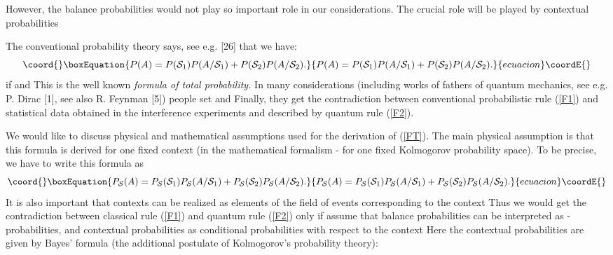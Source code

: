 \documentclass[12pt,oneside,final,a4paper]{article}
\begin{document}
However, the balance probabilities \coordHE{}  would not play 
so important role in our considerations. The crucial role will be played by contextual
probabilities \coordHE{} 





The conventional probability theory says, see e.g. [26] 
that we have:
\begin{equation}\coord{}\boxEquation{
\label{FT}
P(A)= P({\cal S}_1) P(A/{\cal S}_1) + P({\cal S}_2) P(A/{\cal S}_2).
}{
P(A)= P({\cal S}_1) P(A/{\cal S}_1) + P({\cal S}_2) P(A/{\cal S}_2).
}{ecuacion}\coordE{}\end{equation}
if \coordHE{} and \coordHE{}
This is the well known {\it formula of total probability.}
In many considerations (including works of fathers 
of quantum mechanics, see e.g. P. Dirac [1], see also R. Feynman [5]) people 
set \coordHE{} and \coordHE{}
Finally, they get the contradiction between conventional
probabilistic rule (\ref{F1}) and statistical data obtained
in the interference experiments and described by quantum rule (\ref{F2}).


We would like to discuss physical and mathematical
assumptions used for the derivation of (\ref{FT}).
The main physical assumption is that this formula is  derived for one fixed context \coordHE{}
(in the mathematical formalism - for one fixed Kolmogorov probability
space). To be precise, we have to write this formula as 
\begin{equation}\coord{}\boxEquation{
\label{FT1}
P_{{\cal S}}(A)= P_{{\cal S}}({\cal S}_1)  P_{{\cal S}}(A/{\cal S}_1)
+ P_{{\cal S}}({\cal S}_2)  P_{{\cal S}}(A/{\cal S}_2).
}{
P_{{\cal S}}(A)= P_{{\cal S}}({\cal S}_1)  P_{{\cal S}}(A/{\cal S}_1)
+ P_{{\cal S}}({\cal S}_2)  P_{{\cal S}}(A/{\cal S}_2).
}{ecuacion}\coordE{}\end{equation}
It is also important that contexts \coordHE{} 
can be realized as elements of the field of events corresponding
to the context \coordHE{}
Thus we would get the contradiction between classical rule (\ref{F1}) and
quantum rule (\ref{F2}) only if assume that balance probabilities
\coordHE{} can be interpreted as 
\coordHE{}-probabilities, \coordHE{} 
and contextual probabilities \coordHE{}
as conditional probabilities with respect to the context \coordHE{}  Here the contextual 
probabilities are given by Bayes' formula
(the additional postulate of Kolmogorov's probability theory):
\end{document}
